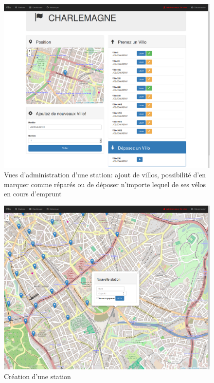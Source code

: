 \documentclass[a4paper,10pt]{article}
\begin{document}
\begin{figure}[H]
  \centering
  \includegraphics[scale=0.2]{admin-station.png}
  \caption{\label{fig:admin-station} Vues d'administration d'une station: ajout de
    villos, possibilité d'en marquer comme réparés ou de déposer n'importe lequel
    de ses vélos en cours d'emprunt}
\end{figure}

\begin{figure}[H]
  \centering
  \includegraphics[scale=0.2]{create-station.png}
  \caption{\label{fig:create-station} Création d'une station}
\end{figure}
\end{document}
